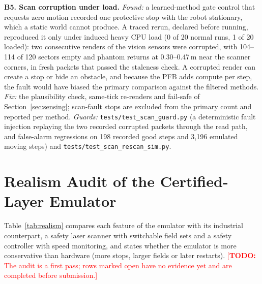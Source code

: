 \documentclass[sensors,article,submit,moreauthors]{Definitions/mdpi}
\newcommand{\todo}[1]{\textcolor{red}{[\textbf{TODO:} #1]}}
\begin{document}
\textbf{B5. Scan corruption under load.}
\emph{Found:} a learned-method gate control that requests zero motion recorded one protective stop with the robot stationary, which a static world cannot produce. A traced rerun, declared before running, reproduced it only under induced heavy CPU load (0 of 20 normal runs, 1 of 20 loaded): two consecutive renders of the vision sensors were corrupted, with 104--114 of 120 sectors empty and phantom returns at 0.30--0.47\,m near the scanner corners, in fresh packets that passed the staleness check. A corrupted render can create a stop or hide an obstacle, and because the PFB adds compute per step, the fault would have biased the primary comparison against the filtered methods.
\emph{Fix:} the plausibility check, same-tick re-renders and fail-safe of Section~\ref{sec:sensing}; scan-fault stops are excluded from the primary count and reported per method.
\emph{Guards:} \texttt{tests/test\_scan\_guard.py} (a deterministic fault injection replaying the two recorded corrupted packets through the read path, and false-alarm regressions on 198 recorded good steps and 3{,}196 emulated moving steps) and \texttt{tests/test\_scan\_rescan\_sim.py}.

\section{Realism Audit of the Certified-Layer Emulator}\label{app:realism}

Table~\ref{tab:realism} compares each feature of the emulator with its industrial counterpart, a safety laser scanner with switchable field sets and a safety controller with speed monitoring, and states whether the emulator is more conservative than hardware (more stops, larger fields or later restarts). \todo{The audit is a first pass; rows marked open have no evidence yet and are completed before submission.}
\end{document}
